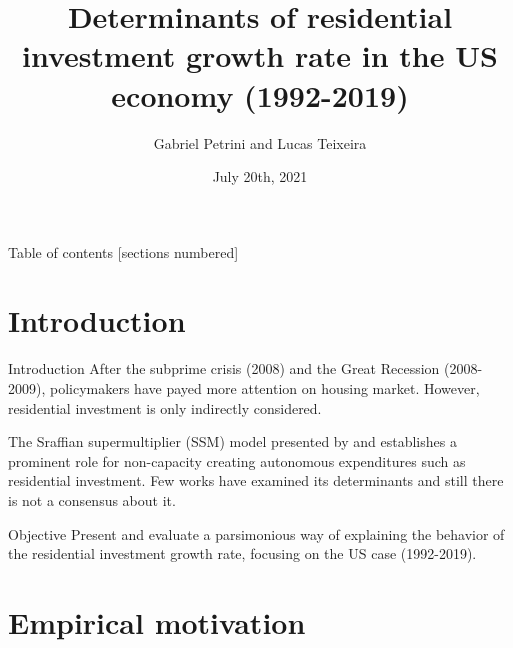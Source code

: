 \documentclass[10pt]{beamer}
\institute{Institute of Economics - University of Campinas/Brazil}
\author{Gabriel Petrini and Lucas Teixeira}
\date{July 20th, 2021}
\title{Determinants of residential investment growth rate in the US economy (1992-2019)}
\begin{document}
\maketitle



\begin{frame}{Table of contents}
  [sections numbered]
  \tableofcontents[hideallsubsections]
\end{frame}

\section{Introduction}
\label{sec:org58b60a0}

\begin{frame}[label={sec:orgf7e76d6}]{Introduction}
After the subprime crisis (2008) and the Great Recession (2008-2009), policymakers have payed more attention on housing market.
However, residential investment is only \alert{indirectly} considered.

The Sraffian supermultiplier (SSM) model presented by \textcite{serrano_long_1995} and \textcite{bortis_institutions_1997} establishes a prominent role for non-capacity creating autonomous expenditures such as \alert{residential investment}.
Few works have examined its determinants and still there is not a consensus about it.


\begin{block}{Objective}
Present and evaluate a parsimonious way of explaining the behavior of the residential investment growth rate, focusing on the US case (1992-2019).
\end{block}
\end{frame}

\section{Empirical motivation}
\label{sec:org0cd09d9}
\end{document}
